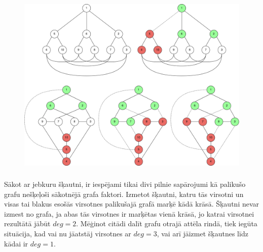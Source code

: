 \documentclass[12pt, a4paper]{article}
\begin{document}
\begin{figure}[h!]
    \centering
    \includegraphics[height=8.9cm,page=1]{task3.jpeg}
\end{figure}
Sākot ar jebkuru šķautni, ir iespējami tikai divi pilnie sapārojumi kā palikušo grafu nešķeļoši sākotnējā grafa faktori. Izmetot šķautni, katru tās virsotni un visas tai blakus esošās virsotnes palikušajā grafā marķē kādā krāsā. Šķautni nevar izmest no grafa, ja abas tās virsotnes ir marķētas vienā krāsā, jo katrai virsotnei rezultātā jābūt $deg=2$. Mēģinot citādi dalīt grafu otrajā attēla rindā, tiek iegūta situācija, kad vai nu jāatstāj virsotnes ar $deg=3$, vai arī jāizmet šķautnes līdz kādai ir $deg=1$.
\end{document}
